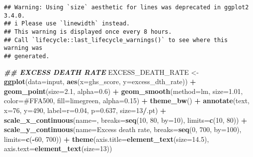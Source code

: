 \documentclass[
]{article}
\newenvironment{Shaded}{\begin{snugshade}}{\end{snugshade}}
\newcommand{\AttributeTok}[1]{\textcolor[rgb]{0.13,0.29,0.53}{#1}}
\newcommand{\DecValTok}[1]{\textcolor[rgb]{0.00,0.00,0.81}{#1}}
\newcommand{\DocumentationTok}[1]{\textcolor[rgb]{0.56,0.35,0.01}{\textbf{\textit{#1}}}}
\newcommand{\FloatTok}[1]{\textcolor[rgb]{0.00,0.00,0.81}{#1}}
\newcommand{\FunctionTok}[1]{\textcolor[rgb]{0.13,0.29,0.53}{\textbf{#1}}}
\newcommand{\NormalTok}[1]{#1}
\newcommand{\OtherTok}[1]{\textcolor[rgb]{0.56,0.35,0.01}{#1}}
\newcommand{\SpecialCharTok}[1]{\textcolor[rgb]{0.81,0.36,0.00}{\textbf{#1}}}
\newcommand{\StringTok}[1]{\textcolor[rgb]{0.31,0.60,0.02}{#1}}
\begin{document}
\begin{verbatim}
## Warning: Using `size` aesthetic for lines was deprecated in ggplot2 3.4.0.
## i Please use `linewidth` instead.
## This warning is displayed once every 8 hours.
## Call `lifecycle::last_lifecycle_warnings()` to see where this warning was
## generated.
\end{verbatim}

\begin{Shaded}
\begin{Highlighting}[]
\DocumentationTok{\#\# EXCESS DEATH RATE}
\NormalTok{EXCESS\_DEATH\_RATE }\OtherTok{\textless{}{-}}\FunctionTok{ggplot}\NormalTok{(}\AttributeTok{data=}\NormalTok{input, }\FunctionTok{aes}\NormalTok{(}\AttributeTok{x=}\NormalTok{ghs\_score, }\AttributeTok{y=}\NormalTok{excess\_dth\_rate)) }\SpecialCharTok{+}
  \FunctionTok{geom\_point}\NormalTok{(}\AttributeTok{size=}\FloatTok{2.1}\NormalTok{, }\AttributeTok{alpha=}\FloatTok{0.6}\NormalTok{) }\SpecialCharTok{+}
  \FunctionTok{geom\_smooth}\NormalTok{(}\AttributeTok{method=}\StringTok{\textquotesingle{}lm\textquotesingle{}}\NormalTok{, }\AttributeTok{size=}\FloatTok{1.01}\NormalTok{, }\AttributeTok{color=}\StringTok{\textquotesingle{}\#FFA500\textquotesingle{}}\NormalTok{, }\AttributeTok{fill=}\StringTok{\textquotesingle{}limegreen\textquotesingle{}}\NormalTok{, }\AttributeTok{alpha=}\FloatTok{0.15}\NormalTok{) }\SpecialCharTok{+}
  \FunctionTok{theme\_bw}\NormalTok{() }\SpecialCharTok{+} \FunctionTok{annotate}\NormalTok{(}\StringTok{\textquotesingle{}text\textquotesingle{}}\NormalTok{, }\AttributeTok{x=}\DecValTok{76}\NormalTok{, }\AttributeTok{y=}\DecValTok{490}\NormalTok{, }\AttributeTok{label=}\StringTok{\textquotesingle{}r=0.04, p=0.637\textquotesingle{}}\NormalTok{, }\AttributeTok{size=}\DecValTok{13}\SpecialCharTok{/}\NormalTok{.pt) }\SpecialCharTok{+}
  \FunctionTok{scale\_x\_continuous}\NormalTok{(}\AttributeTok{name=}\StringTok{\textquotesingle{}\textquotesingle{}}\NormalTok{, }\AttributeTok{breaks=}\FunctionTok{seq}\NormalTok{(}\DecValTok{10}\NormalTok{, }\DecValTok{80}\NormalTok{, }\AttributeTok{by=}\DecValTok{10}\NormalTok{), }\AttributeTok{limits=}\FunctionTok{c}\NormalTok{(}\DecValTok{10}\NormalTok{, }\DecValTok{80}\NormalTok{)) }\SpecialCharTok{+}
  \FunctionTok{scale\_y\_continuous}\NormalTok{(}\AttributeTok{name=}\StringTok{\textquotesingle{}Excess death rate\textquotesingle{}}\NormalTok{, }\AttributeTok{breaks=}\FunctionTok{seq}\NormalTok{(}\DecValTok{0}\NormalTok{, }\DecValTok{700}\NormalTok{, }\AttributeTok{by=}\DecValTok{100}\NormalTok{), }\AttributeTok{limits=}\FunctionTok{c}\NormalTok{(}\SpecialCharTok{{-}}\DecValTok{60}\NormalTok{, }\DecValTok{700}\NormalTok{)) }\SpecialCharTok{+}
  \FunctionTok{theme}\NormalTok{(}\AttributeTok{axis.title=}\FunctionTok{element\_text}\NormalTok{(}\AttributeTok{size=}\FloatTok{14.5}\NormalTok{), }\AttributeTok{axis.text=}\FunctionTok{element\_text}\NormalTok{(}\AttributeTok{size=}\DecValTok{13}\NormalTok{))}


\end{Highlighting}
\end{Shaded}
\end{document}
